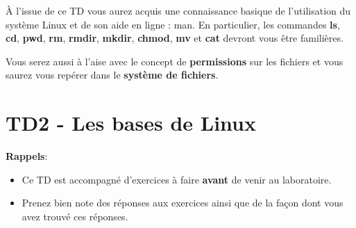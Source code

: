 \documentclass[a4paper,11pt]{article}
\date{2018 -- 2019}
\begin{document}
\entete
\titre
{}
\lastedit


	\begin{tcolorbox}[blanker,
	before skip=10mm,after skip=10mm,
	borderline west={1mm}{-4mm}{lightgray},
	title=Résumé, coltitle=black, fonttitle=\sffamily\bfseries\large]
	\`A l'issue de ce TD vous aurez acquis une connaissance basique de l'utilisation du syst\`eme Linux 
	et de son aide en ligne : man.   
	En particulier, les commandes \textbf{ls}, 
	\textbf{cd}, \textbf{pwd}, 
	\textbf{rm}, \textbf{rmdir}, 
	\textbf{mkdir}, \textbf{chmod}, 
	\textbf{mv} et \textbf{cat} 
	devront vous \^etre famili\`eres.  
	
	\par
	
	Vous serez aussi \`a l'aise avec le concept de \textbf{permissions} 
	sur les fichiers et vous saurez vous rep\'erer dans le \textbf{syst\`eme de fichiers}. 

	\end{tcolorbox}
	
	\tableofcontents

	\newpage

\section{TD2 - Les bases de Linux}\textbf{Rappels}:
					\begin{itemize}
	
	\item Ce TD est accompagn\'e d'exercices \`a faire \textbf{avant} de venir au laboratoire.
	\item Prenez bien note des r\'eponses aux exercices ainsi que de la fa\c con dont vous avez trouv\'e ces r\'eponses.
\end{itemize}
\end{document}
